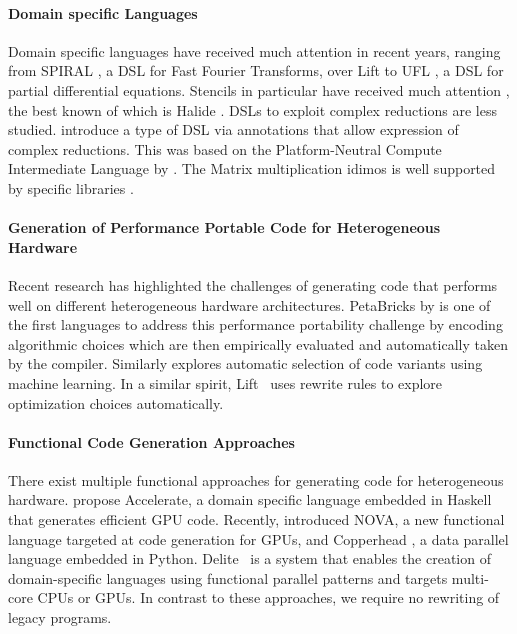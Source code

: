 \paragraph*{Domain specific Languages}
    Domain specific languages have received much attention in recent years,
    ranging from SPIRAL \citep{ofenbeck13spiral}, a DSL for Fast Fourier
    Transforms, over Lift \citep{steuwer15rewrite, SteuwerRD17,HagedornSSGD18}
    to UFL \citep{Alnaes:2014:UFL:2594412.2566630}, a DSL for partial
    differential equations.
    Stencils in particular have received much attention
    \citep{Mullapudi:2015:PAO:2694344.2694364,HagedornSSGD18}, the best known of
    which is Halide \citep{Ragan-Kelley2013Halide}.
    DSLs to exploit complex reductions are less studied.
    \citet{Reddy2016Reduction} introduce a type of DSL via annotations
    that allow expression of complex reductions.
    This was based on the  Platform-Neutral Compute Intermediate Language by
    \citet{baghdadi2015PENCIL}.
    The Matrix multiplication idimos is well supported by
    specific libraries \citep{clblas,mkl,cublas}.

\paragraph*{Generation of Performance Portable Code for Heterogeneous Hardware}
    Recent research has highlighted the challenges of generating code that
    performs well on different heterogeneous hardware architectures.
    PetaBricks by \citet{PhothilimthanaARA13} is one of the first languages to
    address this performance portability challenge by encoding algorithmic
    choices which are then empirically evaluated and automatically taken by the
    compiler.
    Similarly \cite{MuralidharanRHG16} explores automatic selection of code
    variants using machine learning.
    In a similar spirit, Lift~\cite{steuwer15rewrite} uses rewrite rules to
    explore optimization choices automatically.

\paragraph*{Functional Code Generation Approaches}
    There exist multiple functional approaches for generating code for
    heterogeneous hardware.
    \citet{chakravarty11accelerating,mcdonell13optimising} propose Accelerate,
    a domain specific language embedded in Haskell that generates efficient GPU
    code.
    Recently, \citet{collins14nova} introduced NOVA, a new functional language
    targeted at code generation for GPUs, and Copperhead
    \cite{catanzaro11copperhead}, a data parallel language embedded in Python.
    Delite~\cite{brown11heterogeneous,chafi11domain} is a system that enables
    the creation of domain-specific languages using functional parallel patterns
    and targets multi-core CPUs or GPUs.
    In contrast to these approaches, we require no rewriting of legacy programs.

